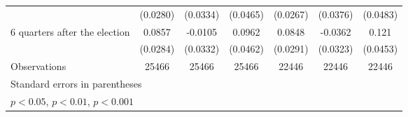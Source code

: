 \begin{table}[!ht]
\begin{tabular}{l*{6}{c}}
                    &    (0.0280)         &    (0.0334)         &    (0.0465)         &    (0.0267)         &    (0.0376)         &    (0.0483)         \\
[1em]
 6 quarters after the election&      0.0857\sym{**} &     -0.0105         &      0.0962\sym{*}  &      0.0848\sym{**} &     -0.0362         &       0.121\sym{**} \\
                    &    (0.0284)         &    (0.0332)         &    (0.0462)         &    (0.0291)         &    (0.0323)         &    (0.0453)         \\
\hline
Observations        &       25466         &       25466         &       25466         &       22446         &       22446         &       22446         \\
\hline\hline
\multicolumn{7}{l}{\footnotesize Standard errors in parentheses}\\
\multicolumn{7}{l}{\footnotesize \sym{*} \(p<0.05\), \sym{**} \(p<0.01\), \sym{***} \(p<0.001\)}\\
\end{tabular}
\end{table}
